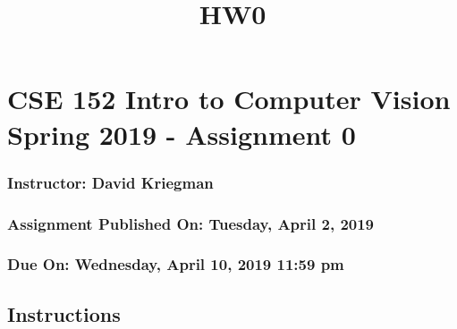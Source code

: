 \documentclass[11pt]{article}
\title{HW0}
\begin{document}
    
    
    \maketitle
    
    

    
    \section{CSE 152 Intro to Computer Vision Spring 2019 - Assignment
0}\label{cse-152-intro-to-computer-vision-spring-2019---assignment-0}

\subsubsection{Instructor: David
Kriegman}\label{instructor-david-kriegman}

\subsubsection{Assignment Published On: Tuesday, April 2,
2019}\label{assignment-published-on-tuesday-april-2-2019}

\subsubsection{Due On: Wednesday, April 10, 2019 11:59
pm}\label{due-on-wednesday-april-10-2019-1159-pm}

\subsection{Instructions}\label{instructions}
\end{document}
